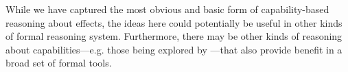 While we have captured the most obvious and basic form of capability-based reasoning about effects, the ideas here could potentially be useful in other kinds of formal reasoning system.
Furthermore, there may be other kinds of reasoning about capabilities---e.g. those being explored by \citet{drossopoulou07}---that also provide benefit in a broad set of formal tools.

